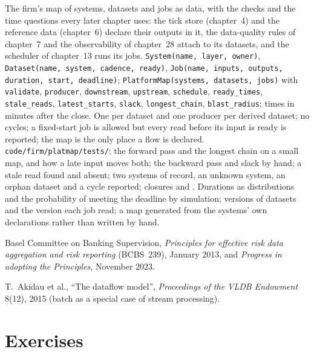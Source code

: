 \begin{build}
 The firm's map of systems, datasets and jobs as data, with the checks and the time questions every later
chapter uses: the tick store (chapter~4) and the reference data (chapter~6) declare their outputs in it, the data-quality rules
of chapter~7 and the observability of chapter~28 attach to its datasets, and the scheduler of chapter~13 runs its jobs.
 \texttt{System(name, layer, owner)}, \texttt{Dataset(name, system, cadence, ready)}, \texttt{Job(name,
inputs, outputs, duration, start, deadline)}; \texttt{PlatformMap(systems, datasets, jobs)} with \texttt{validate},
\texttt{producer}, \texttt{downstream}, \texttt{upstream}, \texttt{schedule}, \texttt{ready\_times}, \texttt{stale\_reads},
\texttt{latest\_starts}, \texttt{slack}, \texttt{longest\_chain}, \texttt{blast\_radius}; times in minutes after the close.
 One  per dataset and one producer per derived dataset; no cycles; a fixed-start job is allowed
but every read before its input is ready is reported; the map is the only place a flow is declared.
 \texttt{code/firm/platmap/tests/}: the forward pass and the longest chain on a small map, and how a
late input moves both; the backward pass and slack by hand; a stale read found and absent; two systems of record, an unknown
system, an orphan dataset and a cycle reported; closures and .
 Durations as distributions and the probability of meeting the deadline by simulation; versions of datasets
and the version each job read; a map generated from the systems' own declarations rather than written by hand.
\end{build}

\begin{omsources}
\item Basel Committee on Banking Supervision, \emph{Principles for effective risk data aggregation and risk reporting}
(BCBS~239), January 2013, and \emph{Progress in adopting the Principles}, November 2023.
\item T.~Akidau et al., ``The dataflow model'', \emph{Proceedings of the VLDB Endowment} 8(12), 2015 (batch as a special case
of stream processing).
\end{omsources}

\section{Exercises}

